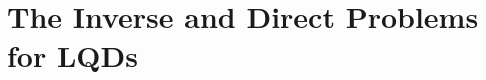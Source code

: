 \documentclass{article}
\numberwithin{equation}{section}
\begin{document}

\section{The Inverse and Direct Problems for LQDs}\label{sec:LQDInvDirectProbs}
\end{document}
